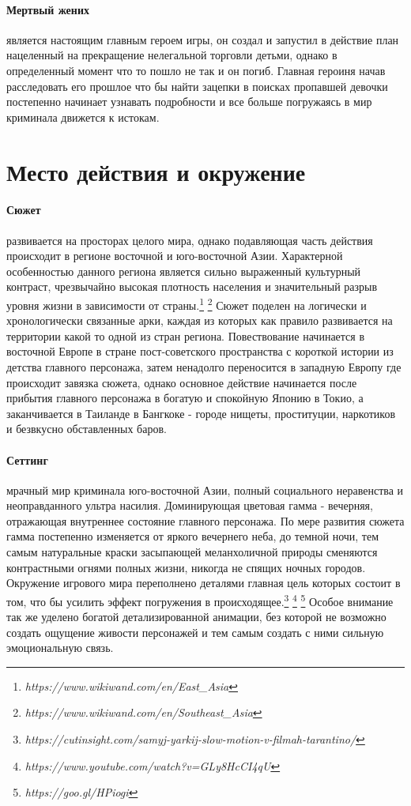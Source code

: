 \documentclass[11pt]{report}
\begin{document}
\paragraph{Мертвый жених} является настоящим главным героем игры, он создал и запустил в действие план нацеленный на прекращение нелегальной торговли детьми, однако в определенный момент что то пошло не так и он погиб. Главная героиня начав расследовать его прошлое что бы найти зацепки в поисках пропавшей девочки постепенно начинает узнавать подробности и все больше погружаясь в мир криминала движется к истокам. 


\section{Место действия и окружение} 
\paragraph{Сюжет} развивается на просторах целого мира, однако подавляющая часть действия происходит в регионе восточной и юго-восточной Азии. Характерной особенностью данного региона является сильно выраженный культурный контраст, чрезвычайно высокая плотность населения и значительный разрыв уровня жизни в зависимости от страны.\footnote{\emph{https://www.wikiwand.com/en/East\_Asia}} \footnote{\emph{https://www.wikiwand.com/en/Southeast\_Asia}} Сюжет поделен на логически и хронологически связанные арки, каждая из которых как правило развивается на территории какой то одной из стран региона. Повествование начинается в восточной Европе в стране пост-советского пространства с короткой истории из детства главного персонажа, затем ненадолго переносится в западную Европу где происходит завязка сюжета, однако основное действие начинается после прибытия главного персонажа в богатую и спокойную Японию в Токио, а заканчивается в Таиланде в Бангкоке - городе нищеты, проституции, наркотиков и безвкусно обставленных баров.
\paragraph{Сеттинг} мрачный мир криминала юго-восточной Азии, полный социального неравенства и неоправданного ультра насилия. Доминирующая цветовая гамма - вечерняя, отражающая внутреннее состояние главного персонажа. По мере развития сюжета гамма постепенно изменяется от яркого вечернего неба, до темной ночи, тем самым натуральные краски засыпающей меланхоличной природы сменяются контрастными огнями полных жизни, никогда не спящих ночных городов. Окружение игрового мира переполнено деталями главная цель которых состоит в том, что бы усилить эффект погружения в происходящее.\footnote{\emph{https://cutinsight.com/samyj-yarkij-slow-motion-v-filmah-tarantino/}} \footnote{\emph{https://www.youtube.com/watch?v=GLy8HcCI4qU}} \footnote{\emph{https://goo.gl/HPiogi}}
Особое внимание так же уделено богатой детализированной анимации, без которой не возможно создать ощущение живости персонажей и тем самым создать с ними сильную эмоциональную связь.
\end{document}
